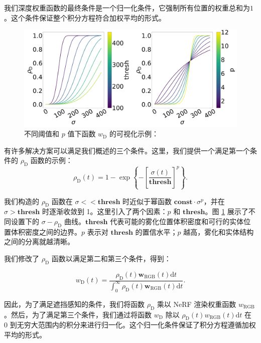 我们深度权重函数的最终条件是一个归一化条件，它强制所有位置的权重总和为$1$。这个条件保证整个积分方程符合加权平均的形式。
\begin{figure}[ht]
    \centering
    \includegraphics[width=\textwidth]{undergraduate-thesis/images/dehazing-nerf/function-family.png}
    \caption{不同阈值和 $p$ 值下函数 $w_\text{D}$ 的可视化示例：}
    \label{fig:dehazing-nerf function-family}
\end{figure}
有许多解决方案可以满足我们概述的三个条件。这里，我们提供一个满足第一个条件的 $\rho_\text{D}$ 函数的示例：
\begin{equation}
    \rho_\text{D}(t) = 1 - \exp\left\{-\left[\frac{\sigma(t)}{\mathbf{thresh}}\right]^p\right\}.
\end{equation}

我们构造的 $\rho_\text{D}$ 函数在 $\sigma << \mathbf{thresh}$ 时近似于幂函数 $\mathbf{const}\cdot \sigma^p$，并在 $\sigma > \mathbf{thresh}$ 时逐渐收敛到 1。这里引入了两个因素：$p$ 和 $\mathbf{thresh}$。图 \ref{fig:dehazing-nerf function-family} 展示了不同设置下的 $\sigma-\rho_\text{D}$ 曲线。$\mathbf{thresh}$ 代表可能的雾化位置体积密度和可行的实体位置体积密度之间的边界。$p$ 表示对 $\mathbf{thresh}$ 的置信水平；$p$ 越高，雾化和实体结构之间的分离就越清晰。

我们修改了 $\rho_\text{D}$ 函数以满足第二和第三个条件，得到：

\begin{equation}
w_\text{D}(t) = \frac{\rho_\text{D}(t) \mathbf{w}_\text{RGB}(t)\text{d}t}{\int_0^\infty \rho_\text{D}(t) \mathbf{w}_\text{RGB}(t)\text{d}t}.
\end{equation}

因此，为了满足遮挡感知的条件，我们将函数 $\rho_\text{D}$ 乘以 NeRF 渲染权重函数 $w_\text{RGB}$。然后，为了满足第三个条件，我们通过将函数 $w_\text{D}$ 除以 $\rho_\text{D}(t) w_\text{RGB}(t)\text{d}t$ 在 0 到无穷大范围内的积分来进行归一化。这个归一化条件保证了积分方程遵循加权平均的形式。

